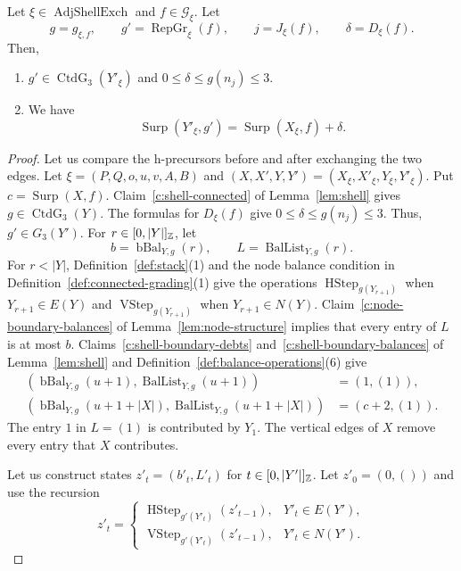 \begin{lemma}\label{lem:uncolored-adjacent-exchange}
Let $\xi\in\operatorname{AdjShellExch}$ and $f\in\mathcal G_\xi$.
Let
\[
 g=g_{\xi,f},\qquad g'=\operatorname{RepGr}_\xi(f),\qquad
 j=J_\xi(f),\qquad\delta=D_\xi(f).
\]
Then,
\begin{enumerate}
\item\label{c:uncolored-exchange-grades} $g'\in\operatorname{CtdG}_3(Y'_\xi)$ and $0\le\delta\le g(n_j)\le3$.
\item\label{c:uncolored-exchange-surplus} We have
\[
 \operatorname{Surp}(Y'_\xi,g')=\operatorname{Surp}(X_\xi,f)+\delta.
\]
\end{enumerate}
\end{lemma}
\begin{proof}
 Let us compare the h-precursors before and after exchanging the two edges.
Let $\xi=(P,Q,o,u,v,A,B)$ and $(X,X',Y,Y')=(X_\xi,X'_\xi,Y_\xi,Y'_\xi)$.
Put $c=\operatorname{Surp}(X,f)$.
Claim~\ref{c:shell-connected} of Lemma~\ref{lem:shell} gives $g\in\operatorname{CtdG}_3(Y)$.
The formulas for $D_\xi(f)$ give $0\le\delta\le g(n_j)\le3$.
Thus, $g'\in G_3(Y')$.
For $r\in[0,|Y|]_{\mathbb Z}$, let
\[
 b=\operatorname{bBal}_{Y,g}(r),\qquad L=\operatorname{BalList}_{Y,g}(r).
\]
For $r<|Y|$, Definition~\ref{def:stack}(1) and the node balance condition in
Definition~\ref{def:connected-grading}(1) give the operations $\operatorname{HStep}_{g(Y_{r+1})}$ when $Y_{r+1}\in E(Y)$ and $\operatorname{VStep}_{g(Y_{r+1})}$ when $Y_{r+1}\in N(Y)$.
Claim~\ref{c:node-boundary-balances} of Lemma~\ref{lem:node-structure}
implies that every entry of $L$ is at most $b$.
Claims~\ref{c:shell-boundary-debts} and~\ref{c:shell-boundary-balances} of Lemma~\ref{lem:shell} and Definition~\ref{def:balance-operations}(6) give
\[
\begin{aligned}
 (\operatorname{bBal}_{Y,g}(u+1),\operatorname{BalList}_{Y,g}(u+1))&=(1,(1)),\\
 (\operatorname{bBal}_{Y,g}(u+1+|X|),\operatorname{BalList}_{Y,g}(u+1+|X|))&=(c+2,(1)).
\end{aligned}
\]
The entry $1$ in $L=(1)$ is contributed by $Y_1$.
The vertical edges of $X$ remove every entry that $X$ contributes.

Let us construct states $z'_t=(b'_t,L'_t)$ for $t\in[0,|Y'|]_{\mathbb Z}$.
Let $z'_0=(0,())$ and use the recursion
\[
 z'_t=\begin{cases}
 \operatorname{HStep}_{g'(Y'_t)}(z'_{t-1}),&Y'_t\in E(Y'),\\
 \operatorname{VStep}_{g'(Y'_t)}(z'_{t-1}),&Y'_t\in N(Y').
 \end{cases}
\]


\end{proof}
